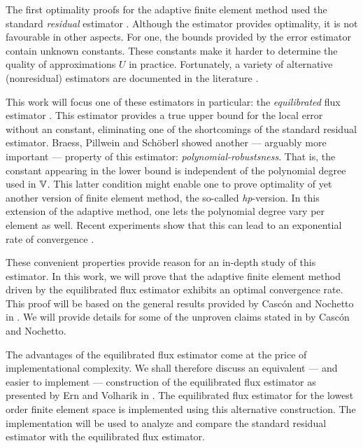 \documentclass[thesis.tex]{subfiles}
\begin{document}
The first optimality proofs for the adaptive finite element method used the standard \emph{residual} estimator \cite{binev, stevenson2007optimality,cascon2008}. Although
the estimator provides optimality, it is not favourable in other aspects. For one, the bounds provided
by the error estimator contain unknown constants. These constants make it harder to determine the quality of 
approximations $U$ in practice.  Fortunately, a variety of alternative (nonresidual) estimators are documented in the literature
\cite{verfurth2013posteriori}.

This work will focus one of these estimators in particular:
the \emph{equilibrated} flux estimator \cite{braessequil, braessequilrobust, ernequil}. This estimator provides a true upper bound
for the local error without an constant, eliminating one of the shortcomings of the standard residual estimator. 
Braess, Pillwein and Sch\"oberl \cite{braessequilrobust} showed another --- arguably more important --- property of this estimator: \emph{polynomial-robustsness}. That is,
the constant appearing in the lower bound is independent of the polynomial degree used in $\mathbb{V}$.
This latter condition might enable one to prove optimality of yet another version of finite element method, the so-called
\emph{hp}-version. In this extension of the adaptive method, one lets the polynomial degree vary per element as well.
Recent experiments show that this can lead to an exponential rate of convergence \cite{dolejvsi2015hp}.

These convenient properties provide reason for an in-depth study of this estimator.
In this work, we will prove that the adaptive finite element method driven by the equilibrated flux estimator 
exhibits an optimal convergence rate. This proof will be based on the general results provided by Casc\'on and Nochetto 
in \cite{cascon2012}. We will provide details for some of the unproven claims stated in \cite{cascon2012}
by Casc\'on and Nochetto.

The advantages of the equilibrated flux estimator come at the price of implementational
complexity. We shall therefore discuss an equivalent --- and easier to implement --- construction of the equilibrated flux estimator
as presented by Ern and Volharik in \cite{ernequil}. The equilibrated flux estimator
for the lowest order finite element space is implemented using this alternative construction. The implementation
will be used to analyze and compare the standard residual estimator with the equilibrated flux estimator.

\end{document}
